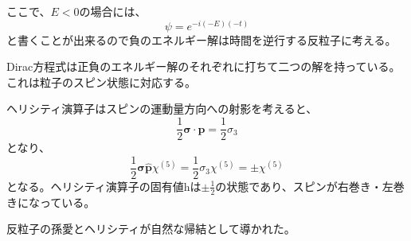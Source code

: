 \documentclass[titlepage]{ltjsarticle}
\begin{document}
ここで、\(E<0\)の場合には、
\begin{equation}
  \psi = e^{-i(-E)(-t)}
\end{equation}
と書くことが出来るので負のエネルギー解は時間を逆行する反粒子に考える。


Dirac方程式は正負のエネルギー解のそれぞれに打ちて二つの解を持っている。
これは粒子のスピン状態に対応する。

ヘリシティ演算子はスピンの運動量方向への射影を考えると、
\begin{equation}
  \frac{1}{2} \bm{\sigma} \cdot \bm{p} = \frac{1}{2}\sigma_3
\end{equation}
となり、
\begin{equation}
  \frac{1}{2}\bm{\sigma} \hat{\bm{p}} \chi^{(5)} = \frac{1}{2}\sigma_3 \chi^{(5)} = \pm \chi^{(5)}
\end{equation}
となる。ヘリシティ演算子の固有値hは\(\pm \frac{1}{2}\)の状態であり、スピンが右巻き・左巻きになっている。

反粒子の孫愛とヘリシティが自然な帰結として導かれた。
\end{document}
